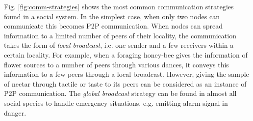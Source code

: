 Fig. \ref{fig:comm-strategies} shows the most common communication strategies found in a  social system.  In the simplest case, when only two nodes can communicate this becomes P2P communication. When nodes can spread information to a limited number of peers of their locality, the communication takes the form of {\em local broadcast}, i.e. one sender and a few receivers within a certain locality. For example, when a foraging honey-bee gives the information of flower sources to a number of peers through various dances, it conveys this information to a few peers through a local broadcast. However, giving the sample of nectar through tactile or taste to its peers can be considered as an instance of P2P communication. The {\em global broadcast} strategy can be found in almost all social species to handle emergency situations, e.g. emitting alarm signal in danger.

